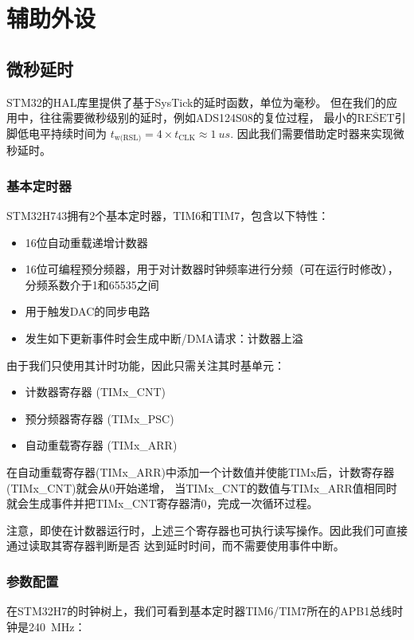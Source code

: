 \section{辅助外设}
\subsection{微秒延时}\label{sec:tim}
STM32的HAL库里提供了基于SysTick的延时函数，单位为毫秒。
但在我们的应用中，往往需要微秒级别的延时，例如ADS124S08的复位过程，
最小的$\overline{\text{RESET}}$引脚低电平持续时间为
$t_\textrm{w(RSL)} = 4\times t_\textrm{CLK}\approx\SI{1}{us}$.
因此我们需要借助定时器来实现微秒延时。

\subsubsection{基本定时器}
STM32H743拥有2个基本定时器，TIM6和TIM7，包含以下特性：

\begin{itemize}
    \item 16位自动重载递增计数器
    \item 16位可编程预分频器，用于对计数器时钟频率进行分频（可在运行时修改），
    分频系数介于1和65535之间
    \item 用于触发DAC的同步电路
    \item 发生如下更新事件时会生成中断/DMA请求：计数器上溢
\end{itemize}

由于我们只使用其计时功能，因此只需关注其时基单元：

\begin{itemize}
    \item 计数器寄存器 (TIMx\_CNT)
    \item 预分频器寄存器 (TIMx\_PSC)
    \item 自动重载寄存器 (TIMx\_ARR)
\end{itemize}

在自动重载寄存器(TIMx\_ARR)中添加一个计数值并使能TIMx后，计数寄存器(TIMx\_CNT)就会从0开始递增，
当TIMx\_CNT的数值与TIMx\_ARR值相同时就会生成事件并把TIMx\_CNT寄存器清0，完成一次循环过程。

注意，即使在计数器运行时，上述三个寄存器也可执行读写操作。因此我们可直接通过读取其寄存器判断是否
达到延时时间，而不需要使用事件中断。

\subsubsection{参数配置}
在STM32H7的时钟树上，我们可看到基本定时器TIM6/TIM7所在的APB1总线时钟是\SI{240}{MHz}：


